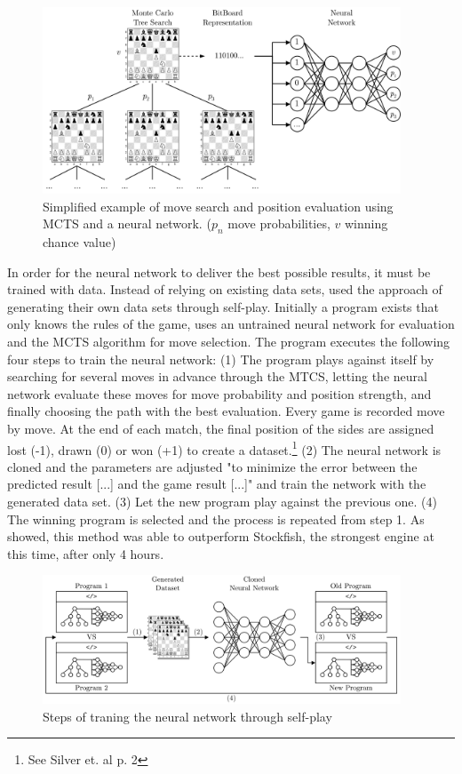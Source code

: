 \begin{figure}[h]
\centering
\includegraphics[width=0.95\textwidth]{graphics/alphazero/alphazero.png}
\caption{Simplified example of move search and position evaluation using MCTS and a neural network. ($p_{n}$ move probabilities, $v$ winning chance value)}
\end{figure}

In order for the neural network to deliver the best possible results, it must be trained with data. Instead of relying on existing data sets, \cite{alphazero-2018} used the approach of generating their own data sets through self-play. Initially a program exists that only knows the rules of the game, uses an untrained neural network for evaluation and the MCTS algorithm for move selection. The program executes the following four steps to train the neural network: (1) The program plays against itself by searching for several moves in advance through the MTCS, letting the neural network evaluate these moves for move probability and position strength, and finally choosing the path with the best evaluation. Every game is recorded move by move. At the end of each match, the final position of the sides are assigned lost (-1), drawn (0) or won (+1) to create a dataset.\footnote{See Silver et. al p. 2} (2) The neural network is cloned and the parameters are adjusted "to minimize the error between the predicted result [...] and the game result [...]" and train the network with the generated data set. (3) Let the new program play against the previous one. (4) The winning program is selected and the process is repeated from step 1. As \cite{alphazero-2018}  showed, this method was able to outperform Stockfish, the strongest engine at this time, after only 4 hours.

\begin{figure}[h]
\centering
\includegraphics[width=0.95\textwidth]{graphics/alphazero/selfplay.png}
\caption{Steps of traning the neural network through self-play}
\end{figure}